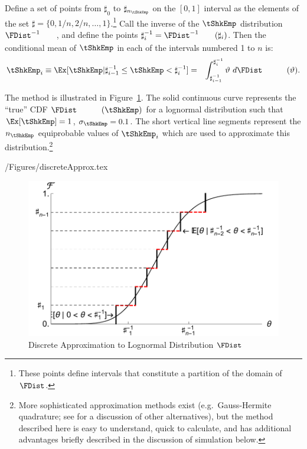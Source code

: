 \documentclass[titlepage]{\econtex}
\begin{document}
 Define a set of points from $\sharp_{0}$ to $\sharp_{n_{\tShkEmp}}$ on the $[0,1]$ interval
as the elements of the set $\sharp = \{0,1/n,2/n, \ldots,1\}$.\footnote{These points define intervals that constitute a partition of the domain of $\FDist$.}  Call the inverse of the $\tShkEmp$ distribution $\FDist^{-1}_{\phantom{\tShkEmp}}$, and define the
points $\sharp^{-1}_{i} = \FDist^{-1}_{\phantom{\tShkEmp}}(\sharp_{i})$.  Then
 the conditional mean of $\tShkEmp$ in each of the intervals numbered 1 to $n$ is:
\begin{eqnarray}
        \tShkEmp_{i} \equiv \Ex[\tShkEmp | \sharp_{i-1}^{-1} \leq \tShkEmp < \sharp_{i}^{-1}] & = & \int_{\sharp^{-1}_{i-1}}^{\sharp^{-1}_{i}} \vartheta ~ d\FDist_{\phantom{\tShkEmp}}(\vartheta)  .
\end{eqnarray}

The method is illustrated in Figure~\ref{fig:discreteapprox}.  The solid continuous curve represents
the ``true'' CDF $\FDist_{\phantom{\tShkEmp}}(\tShkEmp)$ for a lognormal distribution such that $\Ex[\tShkEmp] = 1$, $\sigma_{\tShkEmp} = 0.1$.  The short vertical line segments represent the $n_{\tShkEmp}$
equiprobable values of $\tShkEmp_{i}$ which are used to approximate this
distribution.\footnote{More sophisticated approximation methods exist
  (e.g.\ Gauss-Hermite quadrature; see \cite{kopecky2010finite} for a discussion of other alternatives), but the method described here is easy to understand, quick to calculate, and has additional advantages briefly described in the
discussion of simulation below.}
\begin{verbatimwrite}{\econtexRoot/Figures/discreteApprox.tex}
\hypertarget{discreteApprox}{}
  \begin{figure}
        \includegraphics{./Figures/discreteApprox}
        \caption{Discrete Approximation to Lognormal Distribution $\FDist$}
        \label{fig:discreteapprox}
\end{figure}
\end{verbatimwrite}

\end{document}
